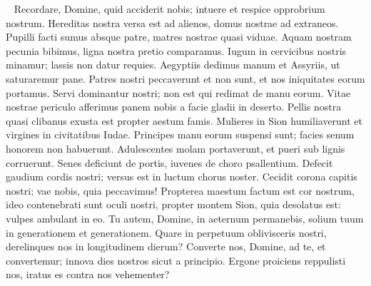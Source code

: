 \begin{biblechapter}   
\verse Recordare, Domine, quid acciderit nobis; intuere et respice opprobrium nostrum. 
\verse Hereditas nostra versa est ad alienos, domus nostrae ad extraneos. 
\verse Pupilli facti sumus absque patre, matres nostrae quasi viduae. 
\verse Aquam nostram pecunia bibimus, ligna nostra pretio comparamus. 
\verse Iugum in cervicibus nostris minamur; lassis non datur requies. 
\verse Aegyptiis dedimus manum et Assyriis, ut saturaremur pane. 
\verse Patres nostri peccaverunt et non sunt, et nos iniquitates eorum portamus.  
\verse Servi dominantur nostri; non est qui redimat de manu eorum. 
\verse Vitae nostrae periculo afferimus panem nobis a facie gladii in deserto. 
\verse Pellis nostra quasi clibanus exusta est propter aestum famis. 
\verse Mulieres in Sion humiliaverunt et virgines in civitatibus Iudae. 
\verse Principes manu eorum suspensi sunt; facies senum honorem non habuerunt. 
\verse Adulescentes molam portaverunt, et pueri sub lignis corruerunt. 
\verse Senes deficiunt de portis, iuvenes de choro psallentium. 
\verse Defecit gaudium cordis nostri; versus est in luctum chorus noster. 
\verse Cecidit corona capitis nostri; vae nobis, quia peccavimus! 
\verse Propterea maestum factum est cor nostrum, ideo contenebrati sunt oculi nostri, 
\verse propter montem Sion, quia desolatus est: vulpes ambulant in eo. 
\verse Tu autem, Domine, in aeternum permanebis, solium tuum in generationem et generationem. 
\verse Quare in perpetuum oblivisceris nostri, derelinques nos in longitudinem dierum? 
\verse Converte nos, Domine, ad te, et convertemur; innova dies nostros sicut a principio. 
\verse Ergone proiciens reppulisti nos, iratus es contra nos vehementer?    
\end{biblechapter}
